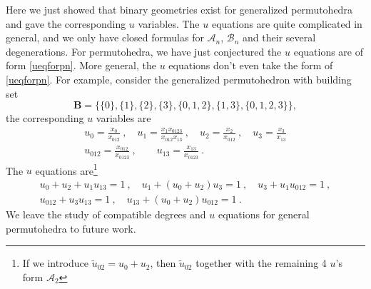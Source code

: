 \documentclass[hidelinks,12pt]{article}
\begin{document}
Here we just showed that binary geometries exist for generalized permutohedra and gave the corresponding $u$ variables. The $u$ equations are quite complicated in general, and we only have closed formulas for $\mathscr{A}_{n}$, $\mathscr{B}_{n}$ and their several degenerations. For permutohedra, we have just conjectured the $u$ equations are of form \eqref{ueqforpn}. More general, the $u$ equations don't even take the form of \eqref{ueqforpn}. For example, consider the generalized permutohedron with building set 
\[
\mathbf{B}=\{\{0\},\{1\},\{2\},\{3\},\{0,1,2\},\{1,3\},\{0,1,2,3\}\},
\]
the corresponding $u$ variables are
\begin{gather*}
   u_{0}=\frac{x_{0}}{x_{012}} \:,\quad  u_{1}=\frac{x_{1}x_{0123}}{x_{012}x_{13}} \:,\quad 
   u_{2}=\frac{x_{2}}{x_{012}} \:, \quad u_{3}=\frac{x_{3}}{x_{13}} \\
   u_{012}=\frac{x_{012}}{x_{0123}}\:,\qquad u_{13}=\frac{x_{13}}{x_{0123}} \:. \quad 
\end{gather*}
The $u$ equations are\footnote{If we introduce $\tilde{u}_{02}=u_{0}+u_{2}$, then $\tilde{u}_{02}$ together with the remaining 4 $u$'s form $\mathscr{A}_{2}$}
\begin{gather*}
u_{0}+u_{2}+u_{1}u_{13}=1\:, \quad  u_{1}+(u_{0}+u_{2})u_{3}=1 \:, \quad u_{3}+u_{1}u_{012}=1\:, \\
u_{012}+u_{3}u_{13}=1\:, \quad u_{13}+(u_{0}+u_{2})u_{012}=1\:.
\end{gather*}
We leave the study of compatible degrees and $u$ equations for general permutohedra to future work.
\end{document}
